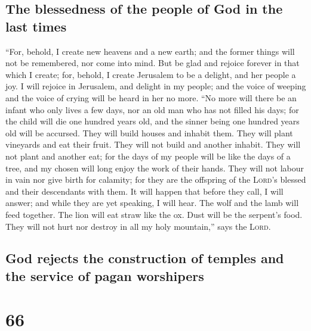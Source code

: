 \hypertarget{the-blessedness-of-the-people-of-god-in-the-last-times}{%
\subsection{The blessedness of the people of God in the last
times}\label{the-blessedness-of-the-people-of-god-in-the-last-times}}

 ``For, behold, I create new heavens and a new earth; and
the former things will not be remembered, nor come into mind.
 But be glad and rejoice forever in that which I create;
for, behold, I create Jerusalem to be a delight, and her people a joy.
 I will rejoice in Jerusalem, and delight in my people;
and the voice of weeping and the voice of crying will be heard in her no
more.  ``No more will there be an infant who only lives a
few days, nor an old man who has not filled his days; for the child will
die one hundred years old, and the sinner being one hundred years old
will be accursed.  They will build houses and inhabit
them. They will plant vineyards and eat their fruit. 
They will not build and another inhabit. They will not plant and another
eat; for the days of my people will be like the days of a tree, and my
chosen will long enjoy the work of their hands.  They
will not labour in vain nor give birth for calamity; for they are the
offspring of the \textsc{Lord}'s blessed and their descendants with
them.  It will happen that before they call, I will
answer; and while they are yet speaking, I will hear. 
The wolf and the lamb will feed together. The lion will eat straw like
the ox. Dust will be the serpent's food. They will not hurt nor destroy
in all my holy mountain,'' says the \textsc{Lord}.

\hypertarget{god-rejects-the-construction-of-temples-and-the-service-of-pagan-worshipers}{%
\subsection{God rejects the construction of temples and the service of
pagan
worshipers}\label{god-rejects-the-construction-of-temples-and-the-service-of-pagan-worshipers}}

\hypertarget{section-65}{%
\section{66}\label{section-65}}


